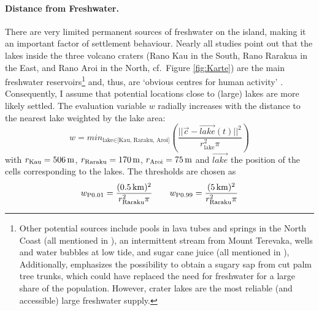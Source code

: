 \paragraph{Distance from Freshwater.}
There are very limited permanent sources of freshwater on the island, making it an important factor of settlement behaviour. 
Nearly all studies point out that the lakes inside the three volcano craters (Rano Kau in the South, Rano Rarakua in the East, and Rano Aroi in the North, cf.\ Figure \ref{fig:Karte}) are the main freshwater reservoirs\footnote{Other potential sources include pools in lava tubes and springs in the North Coast (all mentioned in ), an intermittent stream from Mount Terevaka, wells and water bubbles at low tide, and sugar cane juice (all mentioned in ), 
Additionally, \citet{Mieth2015} emphasizes the possibility to obtain a sugary sap from cut palm tree trunks, which could have replaced the need for freshwater for a large share of the population.
However, crater lakes are the most reliable (and accessible) large freshwater supply.}
and, thus, are `obvious centres for human activity' \citep{Bahn2017}.
Consequently, I assume that potential locations close to (large) lakes are more likely settled.
The evaluation variable $w$ radially increases with the distance to the nearest lake weighted by the lake area:
\begin{equation}
	w = min_{\text{lake}\in \text{[Kau, Raraku, Aroi]}} \left( \frac{||
		 \vec{c}- \vec{lake}(t)||^2}{r_\text{lake}^2\pi} \right)
\end{equation}
with $r_\text{Kau} = 506\, \rm{m}$, $r_\text{Raraku} = 170\, \rm{m}$, $r_\text{Aroi} = 75\, \rm{m}$ and $\vec{lake}$ the position of the cells corresponding to the lakes.
The thresholds are chosen as 
\begin{equation}
w_{\rm P0.01} = \frac{(0.5\, {\rm km})^2}{r_\text{Raraku}^2\pi} \qquad
 w_{\rm P0.99}=\frac{(5\, {\rm km})^2}{r_\text{Raraku}^2\pi}
\end{equation} 
